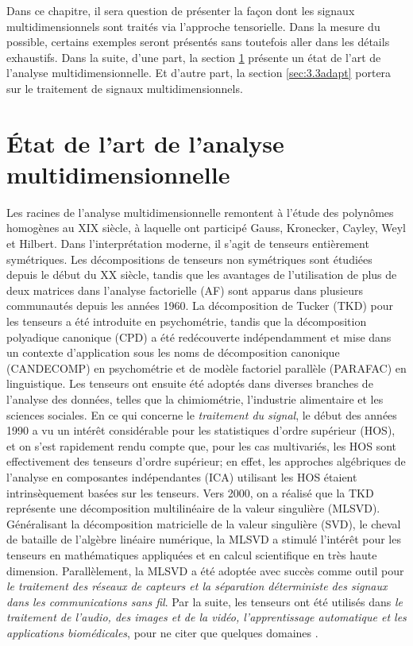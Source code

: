 \documentclass[11pt,a4paper,oneside]{book}
\begin{document}
Dans ce chapitre, il sera question de présenter la façon dont les signaux multidimensionnels sont traités via l'approche tensorielle. Dans la mesure du possible, certains exemples seront présentés sans toutefois aller dans les détails exhaustifs. Dans la suite, d'une part, la section \ref{sec:3.1ETAT} présente un état de l'art de l'analyse multidimensionnelle. Et d'autre part, la section \ref{sec:3.3adapt} portera sur le traitement de signaux multidimensionnels.
\section{État de l'art de l'analyse multidimensionnelle}\label{sec:3.1ETAT}
Les racines de l'analyse multidimensionnelle remontent à l'étude des polynômes homogènes au XIX siècle, à laquelle ont participé Gauss, Kronecker, Cayley, Weyl et Hilbert. Dans l'interprétation moderne, il s'agit de tenseurs entièrement symétriques. Les décompositions de tenseurs non symétriques sont étudiées depuis le début du XX siècle, tandis que les avantages de l'utilisation de plus de deux matrices dans l'analyse factorielle (AF) sont apparus dans plusieurs communautés depuis les années 1960. La décomposition de Tucker (TKD) pour les tenseurs a été introduite en psychométrie, tandis que la décomposition polyadique canonique (CPD) a été redécouverte indépendamment et mise dans un contexte d'application sous les noms de décomposition canonique (CANDECOMP) en psychométrie et de modèle factoriel parallèle (PARAFAC) en linguistique. Les tenseurs ont ensuite été adoptés dans diverses branches de l'analyse des données, telles que la chimiométrie, l'industrie alimentaire et les sciences sociales. En ce qui concerne le \textit{traitement du signal}, le début des années 1990 a vu un intérêt considérable pour les statistiques d'ordre supérieur (HOS), et on s'est rapidement rendu compte que, pour les cas multivariés, les HOS sont effectivement des tenseurs d'ordre supérieur; en effet, les approches algébriques de l'analyse en composantes indépendantes (ICA) utilisant les HOS étaient intrinsèquement basées sur les tenseurs. Vers 2000, on a réalisé que la TKD représente une décomposition multilinéaire de la valeur singulière (MLSVD). Généralisant la décomposition matricielle de la valeur singulière (SVD), le cheval de bataille de l'algèbre linéaire numérique, la MLSVD a stimulé l'intérêt pour les tenseurs en mathématiques appliquées et en calcul scientifique en très haute dimension. Parallèlement, la MLSVD a été adoptée avec succès comme outil pour \textit{le traitement des réseaux de capteurs et la séparation déterministe des signaux dans les communications sans fil}. Par la suite, les tenseurs ont été utilisés dans \textit{le traitement de l'audio, des images et de la vidéo, l'apprentissage automatique et les applications biomédicales}, pour ne citer que quelques domaines \cite[p.146]{cichocki2015tensor}.
\end{document}
